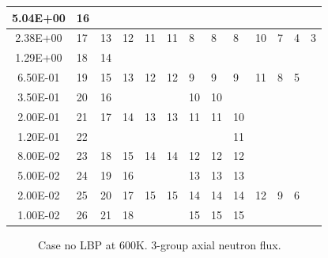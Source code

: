 \documentclass[11pt,letterpaper]{article}
\begin{document}
\begin{table}[htbp!]
\begin{tabular}{c|l|l|l|l|l|l|l|l|l|l|l|l}
  5.04E+00            & 16    &      &      &     &     &     &     &       &     &    &    &   \\ \hline
  2.38E+00            & 17    & 13   & 12   & 11  & 11  & 8   & 8   & 8     & 10  & 7  & 4  & 3 \\ \cline{1-3}
  1.29E+00            & 18    & 14   &      &     &     &     &     &       &     &    &    &   \\ \cline{1-12} 
  6.50E-01            & 19    & 15   & 13   & 12  & 12  & 9   & 9   & 9     & 11  & 8  & 5  &   \\ \cline{1-3} \cline{7-8}
  3.50E-01            & 20    & 16   &      &     &     & 10  & 10  &       &     &    &    &   \\ \cline{1-9}
  2.00E-01            & 21    & 17   & 14   & 13  & 13  & 11  & 11  & 10    &     &    &    &   \\ \cline{1-2} \cline{9-9}
  1.20E-01            & 22    &      &      &     &     &     &     & 11    &     &    &    &   \\ \cline{1-9} 
  8.00E-02            & 23    & 18   & 15   & 14  & 14  & 12  & 12  & 12    &     &    &    &   \\ \cline{1-4} \cline{7-9}
  5.00E-02            & 24    & 19   & 16   &     &     & 13  & 13  & 13    &     &    &    &   \\ \hline
  2.00E-02            & 25    & 20   & 17   & 15  & 15  & 14  & 14  & 14    & 12  & 9  & 6  &   \\ \cline{1-4} \cline{7-9}
  1.00E-02            & 26    & 21   & 18   &     &     & 15  & 15  & 15    &     &    &    &   \\
  \bottomrule
  \end{tabular}
  \label{tab:energygroups}
\end{table}

\begin{figure}[htbp!]
	\centering
	\hfill
    \caption{Case no LBP at 600K. 3-group axial neutron flux.}
	\label{fig:assembly-noLBP-600-flux}
\end{figure}
\end{document}
